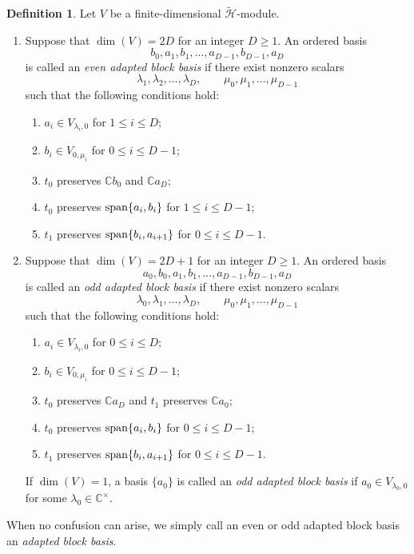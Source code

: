 \documentclass[reqno]{amsart}
\theoremstyle{definition}
\newtheorem{definition}[theorem]{Definition}
\begin{document}
\begin{definition}\label{adapted basis}
%
Let $V$ be a finite-dimensional $\widetilde{\mathcal H}$-module.
\begin{enumerate}
\item[\rm (1)]
Suppose that $\dim(V)=2D$ for an integer $D\geq 1$.
An ordered basis
$$
b_0,a_1,b_1,\ldots,a_{D-1},b_{D-1},a_D
$$
is called an {\it even adapted block basis} if there exist nonzero scalars
$$
\lambda_1, \lambda_2, \dots , \lambda_D, \qquad
\mu_0, \mu_1, \dots, \mu_{D-1}
$$
such that the following conditions hold:
\begin{enumerate}
\item[(i)]
$a_i\in V_{\lambda_i,0}$ for $1\leq i\leq D$;
\item[(ii)]
$b_i\in V_{0,\mu_i}$ for $0\leq i\leq D-1$;
\item[(iii)]
$t_0$ preserves $\mathbb Cb_0$ and $\mathbb Ca_D$;
\item[(iv)]
$t_0$ preserves ${\rm span}\{a_i,b_i\}$ for $1\leq i\leq D-1$;
\item[(v)]
$t_1$ preserves ${\rm span}\{b_i,a_{i+1}\}$ for $0\leq i\leq D-1$.
\end{enumerate}

\item[\rm (2)]
Suppose that $\dim(V)=2D+1$ for an integer $D\geq 1$.
An ordered basis
$$
a_0,b_0,a_1,b_1,\ldots,a_{D-1},b_{D-1},a_D
$$
is called an {\it odd adapted block basis} if there exist nonzero scalars
$$
\lambda_0, \lambda_1, \dots , \lambda_D, \qquad
\mu_0, \mu_1, \dots, \mu_{D-1}
$$
such that the following conditions hold:
\begin{enumerate}
\item[(i)]
$a_i\in V_{\lambda_i,0}$ for $0\leq i\leq D$;
\item[(ii)]
$b_i\in V_{0,\mu_i}$ for $0\leq i\leq D-1$;
\item[(iii)]
$t_0$ preserves $\mathbb Ca_D$ and $t_1$ preserves $\mathbb Ca_0$;
\item[(iv)]
$t_0$ preserves ${\rm span}\{a_i,b_i\}$ for $0\leq i\leq D-1$;
\item[(v)]
$t_1$ preserves ${\rm span}\{b_i,a_{i+1}\}$ for $0\leq i\leq D-1$.
\end{enumerate}
\smallskip
\noindent
If $\dim(V)=1$, a basis $\{a_0\}$ is called an
{\it odd adapted block basis} if
$a_0\in V_{\lambda_0,0}$ for some $\lambda_0\in\mathbb C^\times$.
\end{enumerate}
When no confusion can arise, we simply call an even or odd adapted block basis an {\it adapted block basis}.
%
\end{definition}
\end{document}
